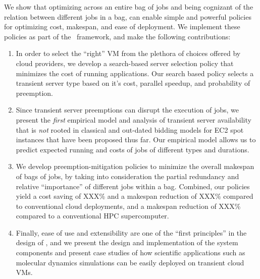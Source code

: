 %
We show that optimizing across an entire bag of jobs and being cognizant of the relation between different jobs in a bag, can enable simple and powerful policies for optimizing cost, makespan, and ease of deployment. 
%
We implement these policies as part of the \sysname~framework, and make the following contributions: 
\vspace*{-6pt}
\begin{enumerate}[leftmargin=12pt]
\item In order to select the ``right'' VM from the plethora of choices offered by cloud providers, we develop a search-based server selection policy that minimizes the cost of running applications. Our search based policy selects a transient server type based on it's cost, parallel speedup, and probability of preemption. 

  
\item Since transient server preemptions can disrupt the execution of jobs, we present the \emph{first} empirical model and analysis of transient server availability that is \emph{not} rooted in classical and out-dated bidding models for EC2 spot instances that have been proposed thus far. Our empirical model allows us to predict expected running and costs of jobs of different types and durations. 

  
\item We develop preemption-mitigation policies to minimize the overall makespan of bags of jobs, by taking into consideration the partial redundancy and relative ``importance'' of different jobs within a bag. Combined, our policies yield a cost saving of XXX\% and a makespan reduction of XXX\% compared to conventional cloud deployments, and a makespan reduction of XXX\% compared to a conventional HPC supercomputer. 

\item Finally, ease of use and extensibility are one of the ``first principles'' in the design of \sysname, and we present the design and implementation of the system components and present case studies of how  scientific applications such as molecular dynamics simulations can be easily deployed on transient cloud VMs. 
\end{enumerate}

